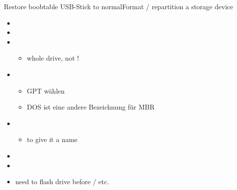 \begin{frame}{Restore boobtable USB-Stick to normal}{Format / repartition a storage device\vspace{0.5cm}}
  \begin{itemize}
    \item {}
    \item {}
    \item {}
    \begin{itemize}
      \item whole drive, not !
    \end{itemize}
    \item {}
      \begin{itemize}
        \item GPT wählen
        \item DOS ist eine andere Bezeichnung für MBR
      \end{itemize}
    \item {}
      \begin{itemize}
        \item {} to give it a name
      \end{itemize}
    \item {}
    \item {}
  \end{itemize}
  \begin{Sidenote}
    \begin{itemize}
      \item need to  flash drive before  /  etc.
    \end{itemize}
  \end{Sidenote}
\end{frame}
